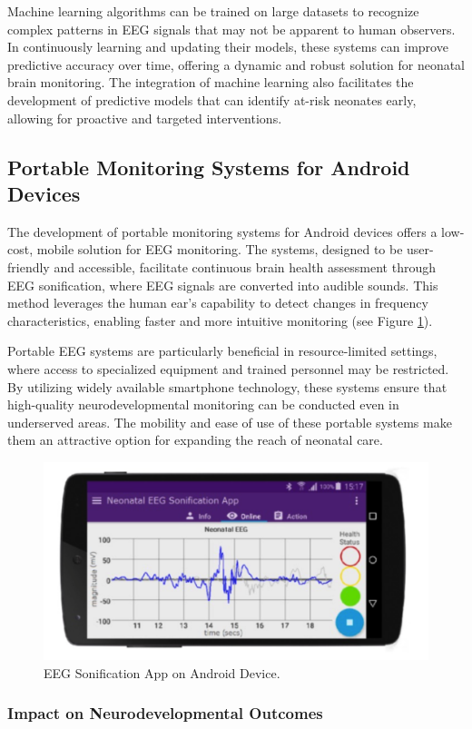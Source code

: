 \documentclass[12pt,journal,compsoc]{IEEEtran}
\begin{document}
Machine learning algorithms can be trained on large datasets to recognize complex patterns in EEG signals that may not be apparent to human observers. In continuously learning and updating their models, these systems can improve  predictive accuracy over time, offering a dynamic and robust solution for neonatal brain monitoring. The integration of machine learning also facilitates the development of predictive models that can identify at-risk neonates early, allowing for proactive and targeted interventions.

\subsection{Portable Monitoring Systems for Android Devices}

The development of portable monitoring systems for Android devices offers a low-cost, mobile solution for EEG monitoring. The systems, designed to be user-friendly and accessible, facilitate continuous brain health assessment through EEG sonification, where EEG signals are converted into audible sounds. This method leverages the human ear's capability to detect changes in frequency characteristics, enabling faster and more intuitive monitoring (see Figure \ref{fig:app_demo}).

Portable EEG systems are particularly beneficial in resource-limited settings, where access to specialized equipment and trained personnel may be restricted. By utilizing widely available smartphone technology, these systems ensure that high-quality neurodevelopmental monitoring can be conducted even in underserved areas. The mobility and ease of use of these portable systems make them an attractive option for expanding the reach of neonatal care.

\begin{figure}[H]
    \centering
    \includegraphics[width=0.6\linewidth]{andorid_app_demo.png}
    \caption{EEG Sonification App on Android Device.}
    \label{fig:app_demo}
\end{figure}

\subsubsection{Impact on Neurodevelopmental Outcomes}
\end{document}
